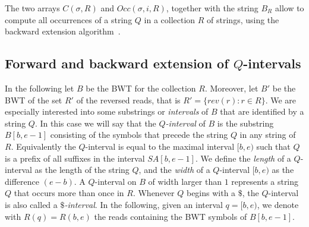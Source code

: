 \documentclass[runningheads,envcountsame,a4paper]{llncs}
\begin{document}
The two arrays $C(\sigma, R)$ and $Occ(\sigma, i, R)$, together with the string $B_{R}$ allow to
compute all occurrences of a string $Q$ in a
collection $R$ of strings, using the backward extension algorithm~\cite{Ferragina2000}.







\subsection{Forward and backward extension of $Q$-intervals}

In the following let $B$ be the BWT for the collection $R$.
Moreover, let $B'$ be the BWT of the set $R'$ of the reversed reads,
that is $R' = \{ rev(r): r \in R\}$.
We are especially interested into some substrings or \emph{intervals} of $B$ that are identified by
a string $Q$.
In this case we will say that the \emph{$Q$-interval} of $B$ is the substring $B[b, e -1]$
consisting of the symbols that precede the string $Q$ in any string of $R$.
Equivalently the $Q$-interval is equal to the maximal interval $[b, e)$ such that
$Q$ is a prefix of all suffixes in the interval $SA[b, e-1]$.
We define the \emph{length} of a $Q$-interval as the length of
the string $Q$, and the \emph{width} of a $Q$-interval $[b, e)$ as the
difference $(e-b)$.
A $Q$-interval on $B$ of width larger than $1$ represents a string $Q$
that occurs more than once in $R$.
Whenever $Q$ begins with a $\$$, the $Q$-interval is also called a \emph{$\$$-interval}.
In the following, given an interval $q=[b,e)$, we denote with $R(q)=R(b,e)$ the reads containing the
BWT symbols of $B[b, e-1]$.
\end{document}
